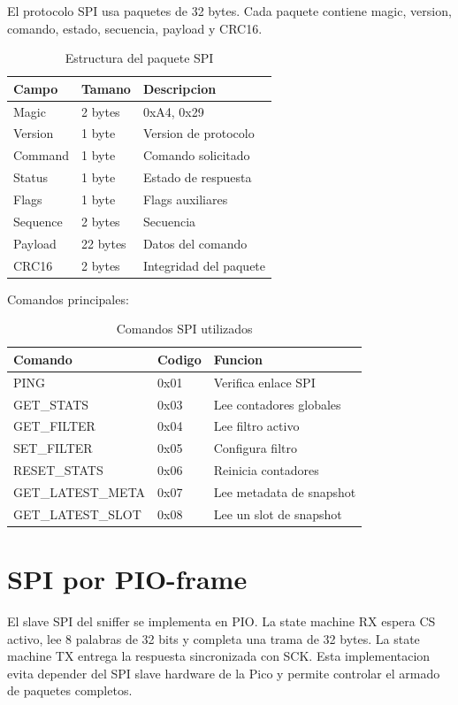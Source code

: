 \documentclass[12pt,a4paper,oneside]{report}
\begin{document}
El protocolo SPI usa paquetes de 32 bytes. Cada paquete contiene magic,
version, comando, estado, secuencia, payload y CRC16.

\begin{table}[H]
\centering
\caption{Estructura del paquete SPI}
\begin{tabular}{lll}
\toprule
Campo & Tamano & Descripcion \\
\midrule
Magic & 2 bytes & 0xA4, 0x29 \\
Version & 1 byte & Version de protocolo \\
Command & 1 byte & Comando solicitado \\
Status & 1 byte & Estado de respuesta \\
Flags & 1 byte & Flags auxiliares \\
Sequence & 2 bytes & Secuencia \\
Payload & 22 bytes & Datos del comando \\
CRC16 & 2 bytes & Integridad del paquete \\
\bottomrule
\end{tabular}
\end{table}

Comandos principales:

\begin{table}[H]
\centering
\caption{Comandos SPI utilizados}
\begin{tabular}{lll}
\toprule
Comando & Codigo & Funcion \\
\midrule
PING & 0x01 & Verifica enlace SPI \\
GET\_STATS & 0x03 & Lee contadores globales \\
GET\_FILTER & 0x04 & Lee filtro activo \\
SET\_FILTER & 0x05 & Configura filtro \\
RESET\_STATS & 0x06 & Reinicia contadores \\
GET\_LATEST\_META & 0x07 & Lee metadata de snapshot \\
GET\_LATEST\_SLOT & 0x08 & Lee un slot de snapshot \\
\bottomrule
\end{tabular}
\end{table}

\section{SPI por PIO-frame}

El slave SPI del sniffer se implementa en PIO. La state machine RX espera CS
activo, lee 8 palabras de 32 bits y completa una trama de 32 bytes. La state
machine TX entrega la respuesta sincronizada con SCK. Esta implementacion evita
depender del SPI slave hardware de la Pico y permite controlar el armado de
paquetes completos.
\end{document}
